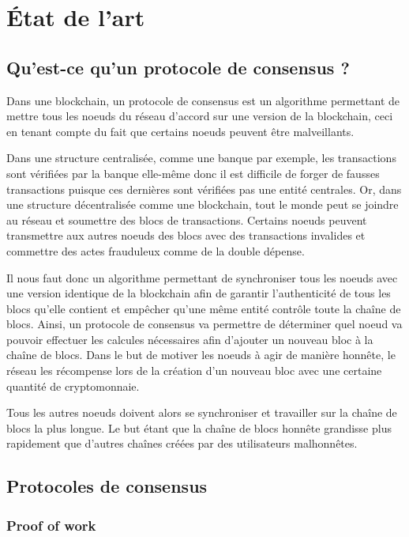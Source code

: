 \chapter{État de l'art}
\label{ch:etat_art}

\section{Qu'est-ce qu'un protocole de consensus ?}

Dans une blockchain, un protocole de consensus est un algorithme permettant de mettre tous les noeuds du réseau d'accord sur une version de la blockchain, ceci en tenant compte du fait que certains noeuds peuvent être malveillants.

Dans une structure centralisée, comme une banque par exemple, les transactions sont vérifiées par la banque elle-même donc il est difficile de forger de fausses transactions puisque ces dernières sont vérifiées pas une entité centrales. Or, dans une structure décentralisée comme une blockchain, tout le monde peut se joindre au réseau et soumettre des blocs de transactions. Certains noeuds peuvent transmettre aux autres noeuds des blocs avec des transactions invalides et commettre des actes frauduleux comme de la double dépense.

Il nous faut donc un algorithme permettant de synchroniser tous les noeuds avec une version identique de la blockchain afin de garantir l'authenticité de tous les blocs qu'elle contient et empêcher qu'une même entité contrôle toute la chaîne de blocs. Ainsi, un protocole de consensus va permettre de déterminer quel noeud va pouvoir effectuer les calcules nécessaires afin d'ajouter un nouveau bloc à la chaîne de blocs. Dans le but de motiver les noeuds à agir de manière honnête, le réseau les récompense lors de la création d'un nouveau bloc avec une certaine quantité de cryptomonnaie. 

Tous les autres noeuds doivent alors se synchroniser et travailler sur la chaîne de blocs la plus longue. Le but étant que la chaîne de blocs honnête grandisse plus rapidement que d'autres chaînes créées par des utilisateurs malhonnêtes.

\section{Protocoles de consensus}

\subsection{Proof of work}

